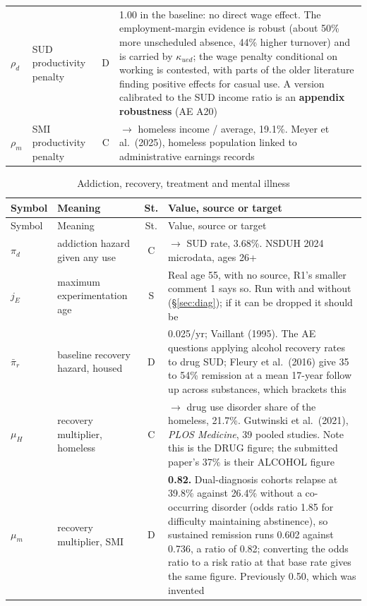 \documentclass[11pt]{article}
\begin{document}
\begin{longtable}{lL{3.8cm}cL{5.8cm}}
$\rho_d$ & SUD productivity penalty & D & 1.00 in the baseline: no direct wage effect. The employment-margin evidence is robust (about 50\% more unscheduled absence, 44\% higher turnover) and is carried by $\kappa_{ued}$; the wage penalty conditional on working is contested, with parts of the older literature finding positive effects for casual use. A version calibrated to the SUD income ratio is an \textbf{appendix robustness} (AE A20)\\
$\rho_m$ & SMI productivity penalty & C & $\rightarrow$ homeless income / average, 19.1\%. Meyer et al.\ (2025), homeless population linked to administrative earnings records\\
\bottomrule
\end{longtable}

\begin{longtable}{lL{3.8cm}cL{5.8cm}}
\caption{Addiction, recovery, treatment and mental illness}\\
\toprule
Symbol & Meaning & St. & Value, source or target\\
\midrule
\endfirsthead
\toprule
Symbol & Meaning & St. & Value, source or target\\
\midrule
\endhead
$\pi_d$ & addiction hazard given any use & C & $\rightarrow$ SUD rate, 3.68\%. NSDUH 2024 microdata, ages 26+\\
$j_E$ & maximum experimentation age & S & Real age 55, with no source, R1's smaller comment 1 says so. Run with and without (\S\ref{sec:diag}); if it can be dropped it should be\\
$\bar\pi_r$ & baseline recovery hazard, housed & D & 0.025/yr; Vaillant (1995). The AE questions applying alcohol recovery rates to drug SUD; Fleury et al.\ (2016) give 35 to 54\% remission at a mean 17-year follow up across substances, which brackets this\\
$\mu_H$ & recovery multiplier, homeless & C & $\rightarrow$ drug use disorder share of the homeless, 21.7\%. Gutwinski et al.\ (2021), \emph{PLOS Medicine}, 39 pooled studies. Note this is the DRUG figure; the submitted paper's 37\% is their ALCOHOL figure\\
$\mu_m$ & recovery multiplier, SMI & D & \textbf{0.82.} Dual-diagnosis cohorts relapse at 39.8\% against 26.4\% without a co-occurring disorder (odds ratio 1.85 for difficulty maintaining abstinence), so sustained remission runs 0.602 against 0.736, a ratio of 0.82; converting the odds ratio to a risk ratio at that base rate gives the same figure. Previously 0.50, which was invented\\

\end{longtable}
\end{document}
